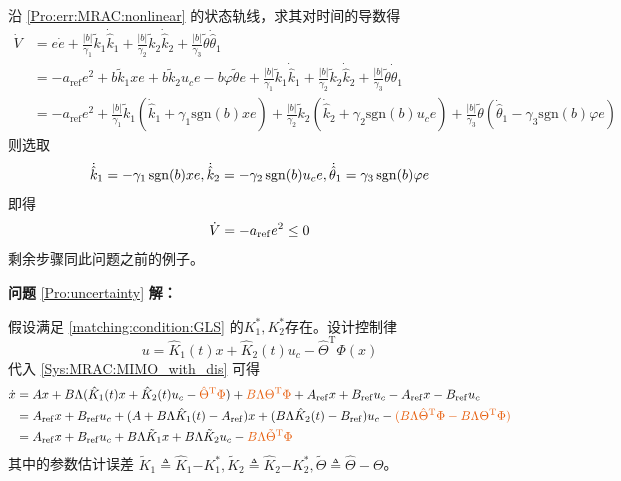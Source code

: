 沿 \eqref{Pro:err:MRAC:nonlinear} 的状态轨线，求其对时间的导数得
\begin{equation*}
    \begin{aligned}\dot{V}&= e\dot{e}+\frac{|b|}{\gamma_{1}}\tilde{k}_{1}\dot{\hat{k}}_{1}+\frac{|b|}{\gamma_{2}}\tilde{k}_{2}\dot{\hat{k}}_{2}+\frac{|b|}{\gamma_{3}}\tilde{\theta}\dot{\hat{\theta}}_{1}\\
    &=-a_{\mathrm{ref}}e^{2}+b\tilde{k}_{1}xe+b\tilde{k}_{2}u_{c}e-b\varphi\tilde{\theta}e+\frac{|b|}{\gamma_{1}}\tilde{k}_{1}\dot{\hat{k}}_{1}+\frac{|b|}{\gamma_{2}}\tilde{k}_{2}\dot{\hat{k}}_{2}+\frac{|b|}{\gamma_{3}}\tilde{\theta}\dot{\hat{\theta}}_{1}\\
    &=-a_{\mathrm{ref}}e^{2}+\frac{|b|}{\gamma_{1}}\tilde{k}_{1}\left(\dot{\hat{k}}_{1}+\gamma_{1}\mathrm{sgn}(b)xe\right)+\frac{|b|}{\gamma_{2}}\tilde{k}_{2}\left(\dot{\hat{k}}_{2}+\gamma_{2}\mathrm{sgn}(b)u_{c}e\right)+\frac{|b|}{\gamma_{3}}\tilde{\theta}\left(\dot{\hat{\theta}}_{1}-\gamma_{3}\mathrm{sgn}(b)\varphi e\right)\end{aligned}
\end{equation*}
则选取
\begin{equation*}
  \dot{\hat{k}}_1 = -  \gamma_1 \operatorname{sgn} (b) x  e,
  \dot{\hat{k}}_2 = -  \gamma_2 \operatorname{sgn} (b)  u_c e,
  \dot{\hat{\theta}}_1 = \gamma_3 \operatorname{sgn} (b)   \varphi e
\end{equation*}
即得
\begin{equation*}
  \dot{V} = - a_{\operatorname{ref}} e^2 \leq 0
\end{equation*}
剩余步骤同此问题之前的例子。

\noindent\textbf{问题} \ref{Pro:uncertainty} \textbf{解：}

假设满足 \eqref{matching:condition:GLS} 的$K^{\ast}_1, K^{\ast}_2$存在。设计控制律\[ u = \hat{K}_1 (t) x + \hat{K}_2 (t) u_c - \hat{\Theta}^\mathrm{T}\Phi (x)  \]
代入 \eqref{Sys:MRAC:MIMO_with_dis} 可得
\begin{align}
    \dot{x}&=A  x + B \Lambda (\hat{K}_1 (t) x + \hat{K}_2 (t) u_c-\textcolor{second}{\hat{\Theta}^\mathrm{T}\Phi})+\textcolor{second}{B\Lambda\Theta^\mathrm{T}\Phi}+
    A_{\refval} x +
    B_{\refval} u_c-A_{\refval} x -
    B_{\refval} u_c\nonumber\\
    &=A_{\refval} x +
    B_{\refval} u_c+(A + B \Lambda \hat{K}_1 (t)-A_{\refval}) x+(B\Lambda\hat{K}_2 (t)-B_{\refval}) u_c-\textcolor{second}{(B\Lambda\hat{\Theta}^\mathrm{T}\Phi-B\Lambda\Theta^\mathrm{T}\Phi)}\nonumber\\
    &=A_{\refval}  x +
   B_{\refval} u_c + B \Lambda  \tilde{K}_1 x + B
   \Lambda  \tilde{K}_2 u_c -\textcolor{second}{B\Lambda\tilde{\Theta}^\mathrm{T}\Phi}\label{mimo_with_dis_dotx}
\end{align}
其中的参数估计误差 $\tilde{K}_1 \triangleq \hat{K}_1 {- K_1^{\ast}} , \tilde{K}_2 \triangleq \hat{K}_2 {- K_2^{\ast}} ,\tilde{\Theta}\triangleq\hat{\Theta}-\Theta$。

